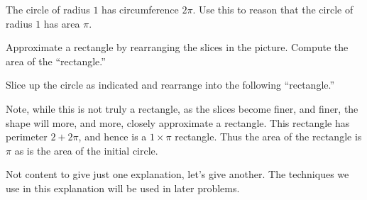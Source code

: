 \documentclass{ximera}
\begin{document}
\begin{problem}
The circle of radius $1$ has circumference $2\pi$. Use this to reason
that the circle of radius $1$ has area $\pi$.
\begin{image}
\end{image}

\begin{hint}
Approximate a rectangle by rearranging the slices in the picture.
Compute the area of the ``rectangle.''
\end{hint}
\begin{freeResponse}
Slice up the circle as indicated and rearrange into the following
``rectangle.'' 
\begin{image}
\end{image}
Note, while this is not truly a rectangle, as the slices become finer,
and finer, the shape will more, and more, closely approximate a
rectangle. This rectangle has perimeter $2+2\pi$, and hence is a
$1\times \pi$ rectangle. Thus the area of the rectangle is $\pi$ as is
the area of the initial circle.
\end{freeResponse}
\end{problem}


Not content to give just one explanation, let's give another. The
techniques we use in this explanation will be used in later problems.
\end{document}
